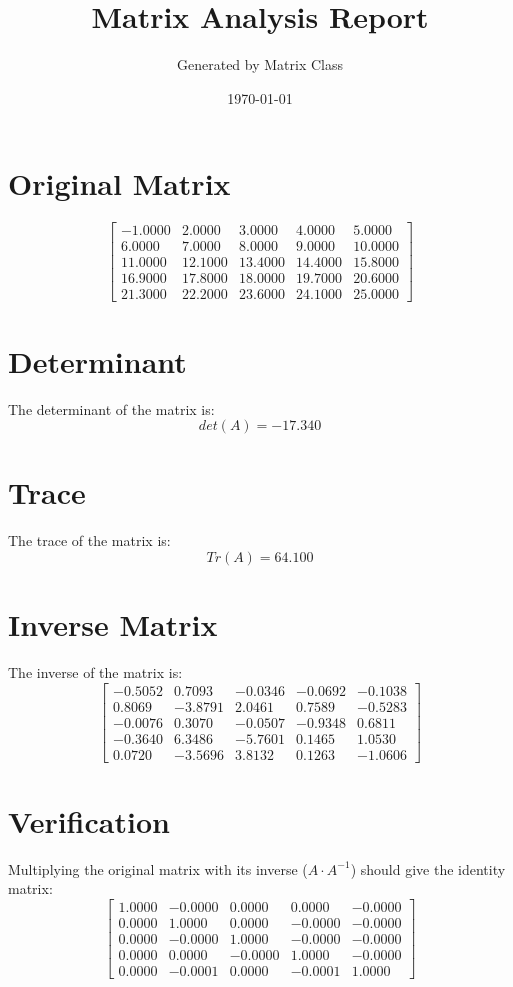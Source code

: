 \documentclass{article}
\title{\color{Othertext}Matrix Analysis Report}
\author{\color{Othertext}Generated by Matrix Class}
\begin{document}
\date{\color{Othertext}\today}
\maketitle


\section{Original Matrix}
\[
\begin{bmatrix}
-1.0000 & 2.0000 & 3.0000 & 4.0000 & 5.0000 \\
6.0000 & 7.0000 & 8.0000 & 9.0000 & 10.0000 \\
11.0000 & 12.1000 & 13.4000 & 14.4000 & 15.8000 \\
16.9000 & 17.8000 & 18.0000 & 19.7000 & 20.6000 \\
21.3000 & 22.2000 & 23.6000 & 24.1000 & 25.0000
\end{bmatrix}
\]

\section{Determinant}
The determinant of the matrix is:
\[
det(A) = -17.340\]

\section{Trace}
The trace of the matrix is:
\[
Tr(A) = 64.100\]

\section{Inverse Matrix}
The inverse of the matrix is:
\[
\begin{bmatrix}
-0.5052 & 0.7093 & -0.0346 & -0.0692 & -0.1038 \\
0.8069 & -3.8791 & 2.0461 & 0.7589 & -0.5283 \\
-0.0076 & 0.3070 & -0.0507 & -0.9348 & 0.6811 \\
-0.3640 & 6.3486 & -5.7601 & 0.1465 & 1.0530 \\
0.0720 & -3.5696 & 3.8132 & 0.1263 & -1.0606
\end{bmatrix}
\]

\section{Verification}
Multiplying the original matrix with its inverse ($A \cdot A^{-1}$) should give the identity matrix:
\[
\begin{bmatrix}
1.0000 & -0.0000 & 0.0000 & 0.0000 & -0.0000 \\
0.0000 & 1.0000 & 0.0000 & -0.0000 & -0.0000 \\
0.0000 & -0.0000 & 1.0000 & -0.0000 & -0.0000 \\
0.0000 & 0.0000 & -0.0000 & 1.0000 & -0.0000 \\
0.0000 & -0.0001 & 0.0000 & -0.0001 & 1.0000
\end{bmatrix}
\]
\end{document}
